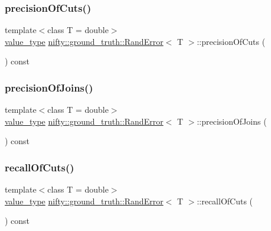 \subsubsection{\texorpdfstring{precision\+Of\+Cuts()}{precisionOfCuts()}}
{\footnotesize\ttfamily template$<$class T  = double$>$ \\
\hyperlink{classnifty_1_1ground__truth_1_1RandError_a8ccf604387e3b5ed939c97c22c75acf9}{value\+\_\+type} \hyperlink{classnifty_1_1ground__truth_1_1RandError}{nifty\+::ground\+\_\+truth\+::\+Rand\+Error}$<$ T $>$\+::precision\+Of\+Cuts (\begin{DoxyParamCaption}{ }\end{DoxyParamCaption}) const\hspace{0.3cm}{\ttfamily [inline]}}

\mbox{\label{classnifty_1_1ground__truth_1_1RandError_ae2ebc221dd0ede53eb15faac8cbce64e}} 
\subsubsection{\texorpdfstring{precision\+Of\+Joins()}{precisionOfJoins()}}
{\footnotesize\ttfamily template$<$class T  = double$>$ \\
\hyperlink{classnifty_1_1ground__truth_1_1RandError_a8ccf604387e3b5ed939c97c22c75acf9}{value\+\_\+type} \hyperlink{classnifty_1_1ground__truth_1_1RandError}{nifty\+::ground\+\_\+truth\+::\+Rand\+Error}$<$ T $>$\+::precision\+Of\+Joins (\begin{DoxyParamCaption}{ }\end{DoxyParamCaption}) const\hspace{0.3cm}{\ttfamily [inline]}}

\mbox{\label{classnifty_1_1ground__truth_1_1RandError_a658d4aa613a71a6bb173add304aa1dff}} 
\subsubsection{\texorpdfstring{recall\+Of\+Cuts()}{recallOfCuts()}}
{\footnotesize\ttfamily template$<$class T  = double$>$ \\
\hyperlink{classnifty_1_1ground__truth_1_1RandError_a8ccf604387e3b5ed939c97c22c75acf9}{value\+\_\+type} \hyperlink{classnifty_1_1ground__truth_1_1RandError}{nifty\+::ground\+\_\+truth\+::\+Rand\+Error}$<$ T $>$\+::recall\+Of\+Cuts (\begin{DoxyParamCaption}{ }\end{DoxyParamCaption}) const\hspace{0.3cm}{\ttfamily [inline]}}

